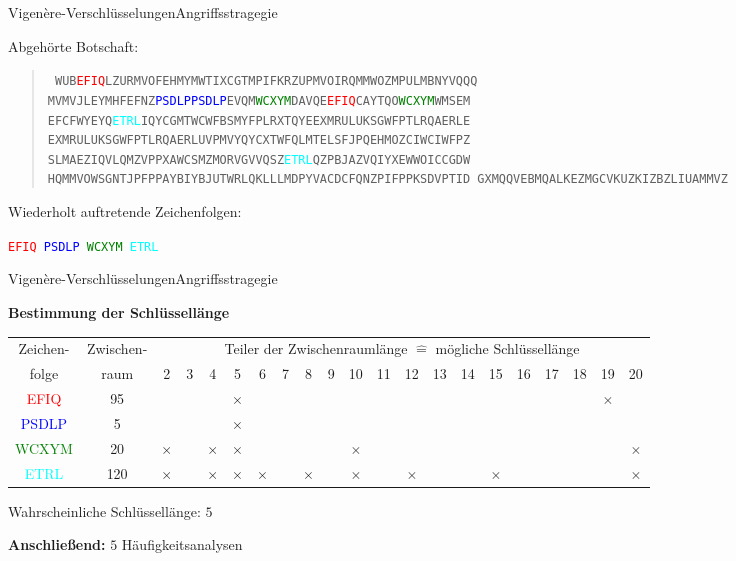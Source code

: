 \documentclass{beamer}
\newcommand{\tb}[1]{{\textcolor{blue}{#1}}}
\newcommand{\tred}[1]{{\textcolor{red}{#1}}}
\theoremstyle{plain}
\begin{document}
\begin{frame}{Vigenère-Verschlüsselungen}{Angriffsstragegie}

Abgehörte Botschaft:

\begin{quote}
\small{\texttt{
WUB\tred{EFIQ}LZURMVOFEHMYMWTIXCGTMPIFKRZUPMVOIRQMMWOZMPULMBNYVQQQ
MVMVJLEYMHFEFNZ\tb{PSDLPPSDLP}EVQM\textcolor{green}{WCXYM}DAVQE\tred{EFIQ}CAYTQO\textcolor{green}{WCXYM}WMSEM
EFCFWYEYQ\textcolor{cyan}{ETRL}IQYCGMTWCWFBSMYFPLRXTQYEEXMRULUKSGWFPTLRQAERLE
EXMRULUKSGWFPTLRQAERLUVPMVYQYCXTWFQLMTELSFJPQEHMOZCIWCIWFPZ
SLMAEZIQVLQMZVPPXAWCSMZMORVGVVQSZ\textcolor{cyan}{ETRL}QZPBJAZVQIYXEWWOICCGDW
HQMMVOWSGNTJPFPPAYBIYBJUTWRLQKLLLMDPYVACDCFQNZPIFPPKSDVPTID
GXMQQVEBMQALKEZMGCVKUZKIZBZLIUAMMVZ}}
\end{quote}

Wiederholt auftretende Zeichenfolgen:

\begin{center}
 \small{\texttt{\tred{EFIQ} \; \tb{PSDLP} \; \textcolor{green}{WCXYM} \; \textcolor{cyan}{ETRL} }}
\end{center}
\end{frame}

\begin{frame}{Vigenère-Verschlüsselungen}{Angriffsstragegie}
 
 \textbf{Bestimmung der Schlüssellänge \vspace{0.5cm}}
 
 \footnotesize{
 \setlength{\tabcolsep}{1mm}
 \begin{tabular}{|c|c|ccccccccccccccccccc|}
  \hline
  Zeichen- & Zwischen- & \multicolumn{19}{c|}{Teiler der Zwischenraumlänge $\hat = $ mögliche Schlüssellänge} \\
  folge & raum & 2 & 3 & 4 & 5 & 6 & 7 & 8 & 9 & 10 & 11 & 12 & 13 & 14 & 15 & 16 & 17 & 18 & 19 & 20 \\
  \hline
  \tred{EFIQ} & 95 &  &  &  & $\times$ &  &  &  &  &  &  &  &  &  &  &  &  &  & $\times$ &  \\
  \tb{PSDLP} & 5 &  &  & & $\times$ &  &  &  &  &  &  &  &  &  &  &  & & &  &  \\
  \textcolor{green}{WCXYM} & 20 & $\times$ &  & $\times$ & $\times$ &  &  &  &  & $\times$ &  &  &  &  & & &  &  &  & $\times$ \\
  \textcolor{cyan}{ETRL}   & 120 & $\times$ &  & $\times$ & $\times$ & $\times$ &  & $\times$ &  & $\times$ &  & $\times$ &  & & $\times$ &  &  & &  & $\times$ \\
  \hline
 \end{tabular}
 }
 \pause
 \normalsize{
 \vspace{0.5cm}
 \begin{center}
 Wahrscheinliche Schlüssellänge: \; $5$
 \end{center}}
  \vspace{0.5cm}
 
 \pause
 \textbf{Anschließend:} $5$ Häufigkeitsanalysen
 \end{frame}
\end{document}
